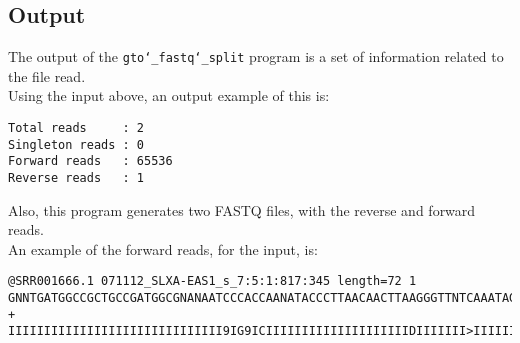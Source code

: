 \subsection*{Output}
The output of the \texttt{gto\char`_fastq\char`_split} program is a set of information related to the file read.\\
Using the input above, an output example of this is:
\begin{lstlisting}
Total reads     : 2
Singleton reads : 0
Forward reads   : 65536
Reverse reads   : 1
\end{lstlisting}
Also, this program generates two FASTQ files, with the reverse and forward reads.\\
An example of the forward reads, for the input, is: 
\begin{lstlisting}
@SRR001666.1 071112_SLXA-EAS1_s_7:5:1:817:345 length=72 1
GNNTGATGGCCGCTGCCGATGGCGNANAATCCCACCAANATACCCTTAACAACTTAAGGGTTNTCAAATAGA
+
IIIIIIIIIIIIIIIIIIIIIIIIIIIIII9IG9ICIIIIIIIIIIIIIIIIIIIIDIIIIIII>IIIIII/
\end{lstlisting}
